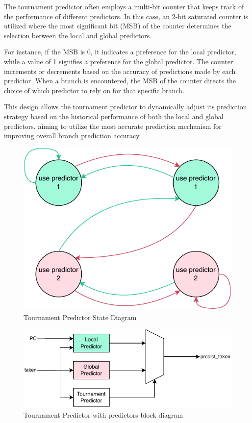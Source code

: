 \documentclass[12pt,a4paper,oneside]{book} %
\begin{document}
The tournament predictor often employs a multi-bit counter that keeps track of the performance of different predictors. In this case, an 2-bit saturated counter is utilized where the most significant bit (MSB) of the counter determines the selection between the local and global predictors.

For instance, if the MSB is 0, it indicates a preference for the local predictor, while a value of 1 signifies a preference for the global predictor. The counter increments or decrements based on the accuracy of predictions made by each predictor. When a branch is encountered, the MSB of the counter directs the choice of which predictor to rely on for that specific branch.

This design allows the tournament predictor to dynamically adjust its prediction strategy based on the historical performance of both the local and global predictors, aiming to utilize the most accurate prediction mechanism for improving overall branch prediction accuracy.

\begin{figure}[H]
    \centering
    \includegraphics[width=.5\textwidth]{images/predictor/tournament.pdf}
    \caption{Tournament Predictor State Diagram}
\end{figure}

\begin{figure}[H]
    \centering
    \includegraphics[width=.8\textwidth]{images/predictor/tournament_diagram.pdf}
    \caption{Tournament Predictor with predictors block diagram}
\end{figure}
\end{document}

